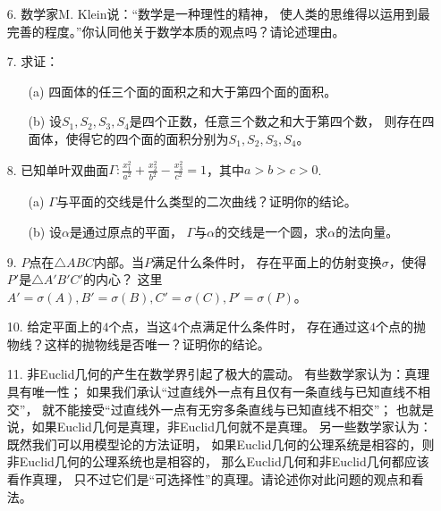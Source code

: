 \begin{itemize}
    \item[6.] 数学家M. Klein说：``数学是一种理性的精神，
    使人类的思维得以运用到最完善的程度。''你认同他关于数学本质的观点吗？请论述理由。
    \item[7.] 求证：
    \begin{itemize}
        \item[(a)] 四面体的任三个面的面积之和大于第四个面的面积。
        \item[(b)] 设$S_1,S_2,S_3,S_4$是四个正数，任意三个数之和大于第四个数，
        则存在四面体，使得它的四个面的面积分别为$S_1,S_2,S_3,S_4$。
    \end{itemize}
    \item[8.] 已知单叶双曲面$\Gamma:\frac{x_1^2}{a^2}+\frac{x_2^2}{b^2}
    -\frac{x_3^2}{c^2}=1$，其中$a>b>c>0$.
    \begin{itemize}
        \item[(a)] $\Gamma$与平面的交线是什么类型的二次曲线？证明你的结论。
        \item[(b)] 设$\alpha$是通过原点的平面，
        $\Gamma$与$\alpha$的交线是一个圆，求$\alpha$的法向量。
    \end{itemize}
    \item[9.] $P$点在$\triangle ABC$内部。当$P$满足什么条件时，
    存在平面上的仿射变换$\sigma$，使得$P'$是$\triangle A'B'C'$的内心？
    这里$A'=\sigma(A),B'=\sigma(B),C'=\sigma(C),P'=\sigma(P)$。
    \item[10.] 给定平面上的$4$个点，当这$4$个点满足什么条件时，
    存在通过这$4$个点的抛物线？这样的抛物线是否唯一？证明你的结论。
    \item[11.] 非Euclid几何的产生在数学界引起了极大的震动。
    有些数学家认为：真理具有唯一性；
    如果我们承认``过直线外一点有且仅有一条直线与已知直线不相交''，
    就不能接受``过直线外一点有无穷多条直线与已知直线不相交''；
    也就是说，如果Euclid几何是真理，非Euclid几何就不是真理。
    另一些数学家认为：既然我们可以用模型论的方法证明，
    如果Euclid几何的公理系统是相容的，则非Euclid几何的公理系统也是相容的，
    那么Euclid几何和非Euclid几何都应该看作真理，
    只不过它们是``可选择性''的真理。请论述你对此问题的观点和看法。
\end{itemize}
~\\

\begin{center}

\end{center}

